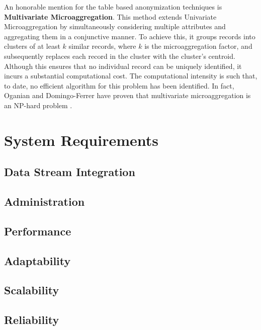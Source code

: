 An honorable mention for the table based anonymization techniques is \textbf{Multivariate Microaggregation}. This method extends Univariate Microaggregation by simultaneously considering multiple attributes and aggregating them in a conjunctive manner. To achieve this, it groups records into clusters of at least $k$ similar records, where $k$ is the microaggregation factor, and subsequently replaces each record in the cluster with the cluster's centroid. Although this ensures that no individual record can be uniquely identified, it incurs a substantial computational cost. The computational intensity is such that, to date, no efficient algorithm for this problem has been identified. In fact, Oganian and Domingo-Ferrer have proven that multivariate microaggregation is an NP-hard problem \cite{oganian_domingo-ferrer_2001}.

\section{System Requirements}
\subsection{Data Stream Integration}
\subsection{Administration}
\subsection{Performance}
\subsection{Adaptability}
\subsection{Scalability}
\subsection{Reliability}
